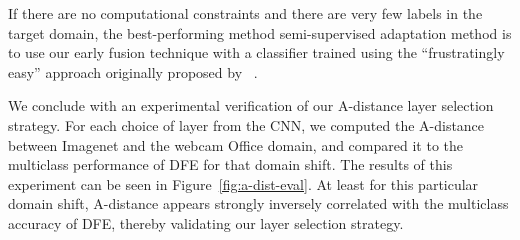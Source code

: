 If there are no computational constraints and there are very few labels in
the target domain, the best-performing method semi-supervised adaptation method is to use our early fusion technique with a classifier trained using the ``frustratingly easy'' approach originally proposed by \daume~\cite{daume}.

We conclude with an experimental verification of our A-distance layer selection strategy.
For each choice of layer from the CNN, we computed the A-distance between Imagenet and the webcam Office domain, and compared it to the multiclass performance of DFE for that domain shift.
The results of this experiment can be seen in Figure~\ref{fig:a-dist-eval}.
At least for this particular domain shift, A-distance appears strongly inversely correlated with the multiclass accuracy of DFE, thereby validating our layer selection strategy. 
